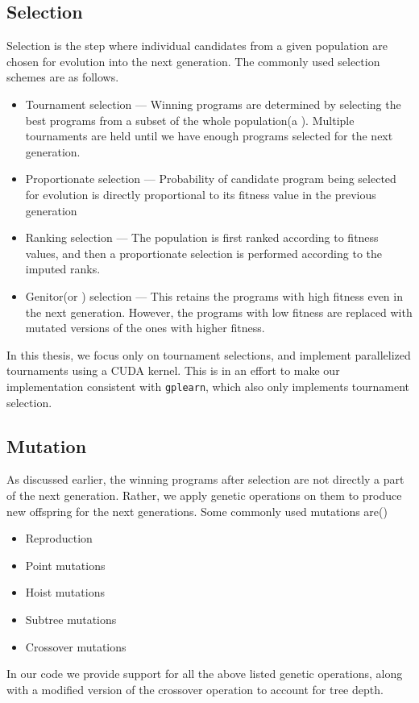 \subsection{Selection}
\label{subsec:selection}
Selection is the step where individual candidates from a given population are chosen for evolution into the next generation. The commonly used selection schemes are as follows\cite{GOLDBERG199169}.
\begin{itemize}
  \item Tournament selection --- Winning programs are determined by selecting the best programs from a subset of the whole population(a ). Multiple tournaments are held until we have enough programs selected for the next generation. 
  \item Proportionate selection --- Probability of candidate program being selected for evolution is directly proportional to its fitness value in the previous generation
  \item Ranking selection --- The population is first ranked according to fitness values, and then a proportionate selection is performed according to the imputed ranks. 
  \item Genitor(or ) selection --- This retains the programs with high fitness even in the next generation. However, the programs with low fitness are replaced with mutated versions of the ones with higher fitness.
\end{itemize}

In this thesis, we focus only on tournament selections, and implement parallelized tournaments using a CUDA kernel. This is in an effort to make our implementation consistent with \texttt{gplearn}\citep{gplearn}, which also only implements tournament selection. 
\subsection{Mutation}
\label{subsec:mutation}
As discussed earlier, the winning programs after selection are not directly a part of the next generation. Rather, we apply genetic operations on them to produce new offspring for the next generations. Some commonly used mutations are(\citep{gplearn})
\begin{itemize}
  \item Reproduction
  \item Point mutations
  \item Hoist mutations
  \item Subtree mutations
  \item Crossover mutations
\end{itemize}
In our code we provide support for all the above listed genetic operations, along with a modified version of the crossover operation to account for tree depth.


